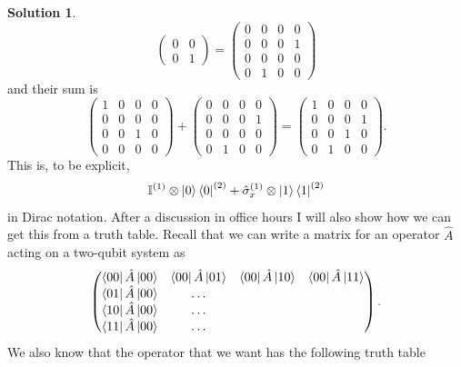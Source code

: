 \documentclass[10pt]{article}
\theoremstyle{definition}
\newtheorem{soln}{Solution}
\begin{document}
\begin{soln}
$$\begin{pmatrix}
      0 & 0 \\
      0 & 1
    \end{pmatrix}
    =\begin{pmatrix}
      0 & 0 & 0 & 0 \\
      0 & 0 & 0 & 1 \\
      0 & 0 & 0 & 0 \\
      0 & 1 & 0 & 0
    \end{pmatrix}
  $$
  and their sum is
  $$\begin{pmatrix}
      1 & 0 & 0 & 0 \\
      0 & 0 & 0 & 0 \\
      0 & 0 & 1 & 0 \\
      0 & 0 & 0 & 0
    \end{pmatrix}+\begin{pmatrix}
      0 & 0 & 0 & 0 \\
      0 & 0 & 0 & 1 \\
      0 & 0 & 0 & 0 \\
      0 & 1 & 0 & 0
    \end{pmatrix}
    =\begin{pmatrix}
      1 & 0 & 0 & 0 \\
      0 & 0 & 0 & 1 \\
      0 & 0 & 1 & 0 \\
      0 & 1 & 0 & 0
    \end{pmatrix}.
  $$
  This is, to be explicit,
  $$\mathbb{I}^{(1)}\otimes \ket{0}\bra{0}^{(2)} +\hat{\sigma}_x^{(1)}\otimes \ket{1}\bra{1}^{(2)}$$
  in Dirac notation. After a discussion in office hours I will also show how we can get this from a truth table.
  Recall that we can write a matrix for an operator $\hat{A}$ acting on a two-qubit system as
  $$\begin{pmatrix}
      \bra{00}\hat{A}\ket{00} & \bra{00}\hat{A}\ket{01} & \bra{00}\hat{A}\ket{10} & \bra{00}\hat{A}\ket{11} \\
      \bra{01}\hat{A}\ket{00} & \dots                   &                         &                         \\
      \bra{10}\hat{A}\ket{00} & \dots                   &                         &                         \\
      \bra{11}\hat{A}\ket{00} & \dots                   &                         &                         \\
    \end{pmatrix}
    .$$
  We also know that the operator that we want has the following truth table

\end{soln}
\end{document}
